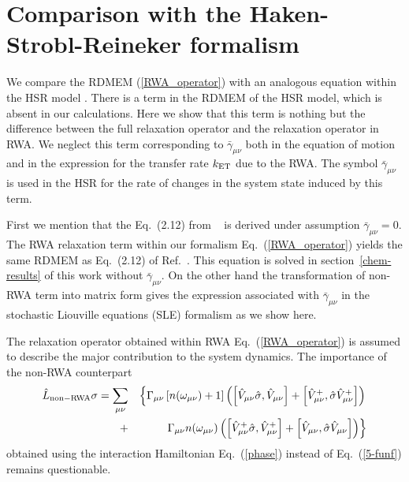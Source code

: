 \documentclass[12pt,twoside,a4paper]{report}
\begin{document}
{\chapter{Comparison with the Haken-Strobl-Reineker formalism}\label{chem-HSR}
We compare the RDMEM (\ref{RWA_operator}) with an analogous
equation within the HSR model
\cite{rein82,hake72,hake73,rein79,herm93}.  
There is a term in the RDMEM
of the HSR model, 
which is absent in
our calculations.
Here we show that 
this term is nothing but the difference 
between the full relaxation operator 
and the relaxation operator in RWA.
We neglect this term 
corresponding to $\bar {\gamma}_{ \mu \nu }$ 
both in the equation of motion and 
in the expression for the transfer rate
$k_{\rm ET}$ due to the RWA.
The symbol  $\bar{\gamma }_{ \mu \nu}$ is used in the 
HSR
for  the rate of changes in the system state induced by this term.


First we mention that the Eq.~(2.12) from ~\cite{herm93}
is derived under assumption $\bar{\gamma }_{ \mu \nu }=0$. The RWA
relaxation term within our formalism Eq.~(\ref{RWA_operator}) 
yields the same RDMEM
as Eq.~(2.12) of Ref.~\cite{herm93}. This equation is solved in 
section~\ref{chem-results}
of this work without  $\bar{\gamma }_{ \mu \nu }$. On the other
hand the transformation of non-RWA term into matrix form gives the
expression associated with $\bar{\gamma }_{ \mu \nu }$ in the stochastic
Liouville equations (SLE) formalism \cite{rein82} as we show here.





The relaxation operator obtained within RWA
Eq.~(\ref{RWA_operator}) 
is assumed to describe the major contribution to the system
dynamics. 
The importance of the  non-RWA counterpart 
\begin{eqnarray}  \label{non-RWA_operator}
  \hat L_{\rm non-RWA}\sigma=\sum\limits_{\mu \nu} 
 &&\left\{
    \Gamma_{\mu \nu}
           \left[
               n(\omega_{\mu \nu})+1
           \right]
           \left( \left[
                     \hat{V}_{\mu \nu}\hat{\sigma},\hat{V}_{\mu \nu}
                 \right] 
                 +\left[
                    \hat{V}_{\mu \nu}^{+},\hat{\sigma}\hat{V}_{\mu \nu}^{+}
                  \right]
           \right) 
  \right.  \nonumber \\ 
+&&\left. 
    \Gamma_{\mu \nu} n(\omega_{\mu \nu })
           \left( \left[ 
                     \hat{V}_{\mu \nu}^{+}\hat{\sigma}, \hat{V}_{\mu \nu}^{+}
                  \right] 
                 +\left[
                     \hat{V}_{\mu \nu},\hat{\sigma}\hat{V} _{\mu \nu}
                  \right]
           \right) 
  \right\}
\end{eqnarray}
obtained using the interaction Hamiltonian Eq.~(\ref{phase}) instead of Eq.~(\ref{5-funf})
remains questionable. 


}
\end{document}
